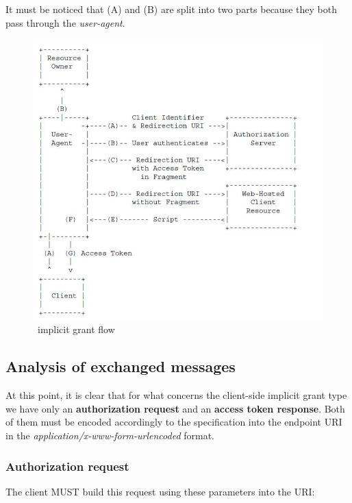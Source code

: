 It must be noticed that (A) and (B) are split into two parts because they both pass through the \textit{user-agent}.

\begin{figure}[htbp]
    \centering
    \includegraphics[scale=0.6]{chapters/images/chp2/client.jpg}
    \caption{\ implicit grant flow}
    \label{fig:flowa}
\end{figure}

\vspace{1cm}

\subsection{Analysis of exchanged messages}
At this point, it is clear that for what concerns the client-side implicit grant type we have only an \textbf{authorization request} and an \textbf{access token response}. Both of them must be encoded accordingly to the specification into the endpoint URI in the \textit{application/x-www-form-urlencoded} format.

\subsubsection{Authorization request}
\label{authreq}
The client MUST build this request using these parameters into the URI:

